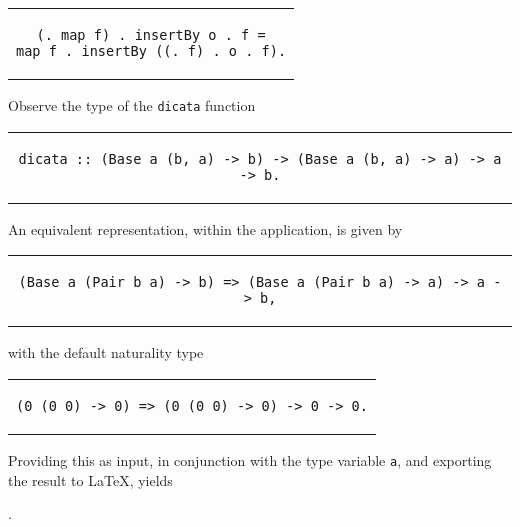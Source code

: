 \documentclass[../Dissertation.tex]{subfiles}
\begin{document}
\begin{center}
\begin{tabular}{c}
\begin{lstlisting}
(. map f) . insertBy o . f =
map f . insertBy ((. f) . o . f).
\end{lstlisting}
\end{tabular}
\end{center}
Observe the type of the \lstinline{dicata} function
\begin{center}
\begin{tabular}{c}
\begin{lstlisting}[basicstyle=\footnotesize\ttfamily,style=haskellStyle]
dicata :: (Base a (b, a) -> b) -> (Base a (b, a) -> a) -> a -> b.
\end{lstlisting}
\end{tabular}
\end{center}
An equivalent representation, within the application, is given by
\begin{center}
\begin{tabular}{c}
\begin{lstlisting}[basicstyle=\footnotesize\ttfamily,style=haskellStyle]
(Base a (Pair b a) -> b) => (Base a (Pair b a) -> a) -> a -> b,
\end{lstlisting}
\end{tabular}
\end{center}
with the default naturality type
\begin{center}
\begin{tabular}{c}
\begin{lstlisting}
(0 (0 0) -> 0) => (0 (0 0) -> 0) -> 0 -> 0.
\end{lstlisting}
\end{tabular}
\end{center}
Providing this as input, in conjunction with the type variable \lstinline{a}, and exporting the result to LaTeX, yields
\begin{center}
  .
\end{center}
\end{document}
